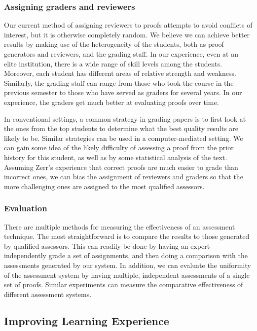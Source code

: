 \documentclass[12pt]{article}
\begin{document}
\subsubsection*{Assigning graders and reviewers}

Our current method of assigning reviewers to proofs attempts to avoid
conflicts of interest, but it is otherwise completely random.  We
believe we can achieve better results by making use of the
heterogeneity of the students, both as proof generators and reviewers,
and the grading staff.  In our experience, even at an elite
institution, there is a wide range of skill levels among the students.
Moreover, each student has different areas of relative strength and
weakness.  Similarly, the grading staff can range from those who took
the course in the previous semester to those who have served as
graders for several years.  In our experience, the graders get much
better at evaluating proofs over time.

In conventional settings, a common strategy in grading papers is to
first look at the ones from the top students to determine what the
best quality results are likely to be.  Similar strategies can be used
in a computer-mediated setting.  We can gain some idea of the likely
difficulty of assessing a proof from the prior history for this
student, as well as by some statistical analysis of the text.
Assuming Zerr's experience that correct proofs are much easier to
grade than incorrect ones, we can bias the assignment of reviewers and
graders so that the more challenging ones are assigned to the most
qualified assessors.

\subsubsection*{Evaluation}

There are multiple methods for measuring the effectiveness of an
assessment technique.  The most straightforward is to compare the
results to those generated by qualified assessors.  This can readily
be done by having an expert independently grade a set of
assignments, and then doing a comparison with the assessments
generated by our system.  In addition, we can evaluate the uniformity
of the assessment system by having multiple, independent assessments
of a single set of proofs.  Similar experiments can measure the
comparative effectiveness of different assessment systems.

\subsection{Improving Learning Experience}
\end{document}
